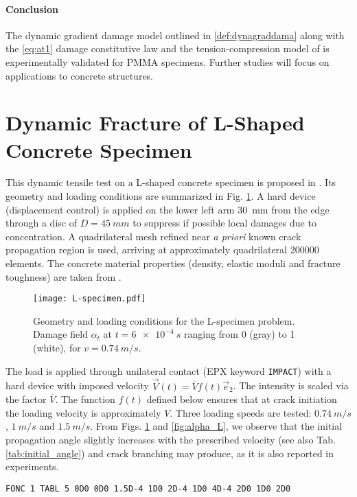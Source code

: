 \paragraph{Conclusion} The dynamic gradient damage model outlined in \cref{def:dynagraddama} along with the \eqref{eq:at1} damage constitutive law and the tension-compression model of \cite{FreddiRoyer-Carfagni:2010} is experimentally validated for PMMA specimens. Further studies will focus on applications to concrete structures.

\section{Dynamic Fracture of L-Shaped Concrete Specimen} \label{sec:L-specimen}
This dynamic tensile test on a L-shaped concrete specimen is proposed in \cite{OzboltBedeSharmaMayer:2015}. Its geometry and loading conditions are summarized in Fig. \ref{fig:L-specimen}. A hard device (displacement control) is applied on the lower left arm \SI{30}{mm} from the edge through a disc of $D=\SI{45}{mm}$ to suppress if possible local damages due to concentration. A quadrilateral mesh refined near \emph{a priori} known crack propagation region is used, arriving at approximately quadrilateral \num{200000} elements. The concrete material properties (density, elastic moduli and fracture toughness) are taken from \cite{OzboltBedeSharmaMayer:2015}.
\begin{figure}[htbp]
\centering
\texttt{[image: L-specimen.pdf]}
\caption{Geometry and loading conditions for the L-specimen problem. Damage field $\alpha_t$ at $t=\SI{6e-4}{s}$ ranging from 0 (gray) to 1 (white), for $v=\SI{0.74}{m/s}$.} \label{fig:L-specimen}
\end{figure}

The load is applied through unilateral contact (EPX keyword \texttt{IMPACT}) with a hard device with imposed velocity $\vec{V}(t)=\overline{V}f(t)\vec{e}_2$. The intensity is scaled via the factor $\overline{V}$. The function $f(t)$ defined below ensures that at crack initiation the loading velocity is approximately $V$. Three loading speeds are tested: $\SI{0.74}{m/s}$, $\SI{1}{m/s}$ and $\SI{1.5}{m/s}$. From Figs. \ref{fig:L-specimen} and \ref{fig:alpha_L}, we observe that the initial propagation angle slightly increases with the prescribed velocity (see also Tab. \ref{tab:initial_angle}) and crack branching may produce, as it is also reported in experiments.
\begin{mdframed}[hidealllines=true,backgroundcolor=gray!20]
\begin{verbatim}
FONC 1 TABL 5 0D0 0D0 1.5D-4 1D0 2D-4 1D0 4D-4 2D0 1D0 2D0
\end{verbatim}
\end{mdframed}

